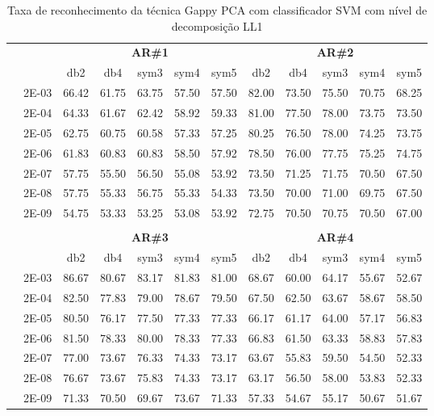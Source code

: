 \begin{table}[H]
	\centering
    \normalsize
	\caption{Taxa de reconhecimento da técnica Gappy PCA com classificador SVM com nível de decomposição LL1}
	\begin{tabular}{|c|c|c c c c c|c c c c c|}
\cline{3-12}
\multicolumn{2}{c|}{\multirow{2}{*}{}} & \multicolumn{5}{c|}{\textbf{AR\#1}}  & \multicolumn{5}{c|}{\textbf{AR\#2}} \\\cline{3-12}

\multicolumn{2}{c|}{}  & db2 & db4 & sym3 & sym4 & sym5 & db2 & db4& sym3 & sym4 & sym5 \\\hline
\multicolumn{1}{|c|}{ \multirow{6}{*}{\rotatebox[origin=c]{90}{\textbf{Gamma}}} }
&2E-03&	66.42&	61.75&	63.75&	57.50&	57.50&	82.00&	73.50&	75.50&	70.75&	68.25	\\\cline{2-12}
&2E-04&	64.33&	61.67&	62.42&	58.92&	59.33&	81.00&	77.50&	78.00&	73.75&	73.50	\\\cline{2-12}
&2E-05&	62.75&	60.75&	60.58&	57.33&	57.25&	80.25&	76.50&	78.00&	74.25&	73.75	\\\cline{2-12}
&2E-06&	61.83&	60.83&	60.83&	58.50&	57.92&	78.50&	76.00&	77.75&	75.25&	74.75	\\\cline{2-12}
&2E-07&	57.75&	55.50&	56.50&	55.08&	53.92&	73.50&	71.25&	71.75&	70.50&	67.50	\\\cline{2-12}
&2E-08&	57.75&	55.33&	56.75&	55.33&	54.33&	73.50&	70.00&	71.00&	69.75&	67.50	\\\cline{2-12}
&2E-09&	54.75&	53.33&	53.25&	53.08&	53.92&	72.75&	70.50&	70.75&	70.50&	67.00	


\\ \midrule
\multicolumn{12}{c}{}\\ 

\cline{3-12}
\multicolumn{2}{c}{} & \multicolumn{5}{|c|}{\textbf{AR\#3}}  & \multicolumn{5}{c|}{\textbf{AR\#4}} \\\cline{3-12}
\multicolumn{2}{c}{}  & \multicolumn{1}{|c}{db2} & db4 & sym3 & sym4 & sym5 & db2 & db4& sym3 & sym4 & sym5 \\\hline
\multicolumn{1}{|c|}{ \multirow{6}{*}{\rotatebox[origin=c]{90}{\textbf{Gamma}}} }
&2E-03&	86.67&	80.67&	83.17&	81.83&	81.00&	68.67&	60.00&	64.17&	55.67&	52.67	\\\cline{2-12}
&2E-04&	82.50&	77.83&	79.00&	78.67&	79.50&	67.50&	62.50&	63.67&	58.67&	58.50	\\\cline{2-12}
&2E-05&	80.50&	76.17&	77.50&	77.33&	77.33&	66.17&	61.17&	64.00&	57.17&	56.83	\\\cline{2-12}
&2E-06&	81.50&	78.33&	80.00&	78.33&	77.33&	66.83&	61.50&	63.33&	58.83&	57.83	\\\cline{2-12}
&2E-07&	77.00&	73.67&	76.33&	74.33&	73.17&	63.67&	55.83&	59.50&	54.50&	52.33	\\\cline{2-12}
&2E-08&	76.67&	73.67&	75.83&	74.33&	73.17&	63.17&	56.50&	58.00&	53.83&	52.33	\\\cline{2-12}
&2E-09&	71.33&	70.50&	69.67&	73.67&	71.33&	57.33&	54.67&	55.17&	50.67&	51.67	
	

\end{tabular}
\end{table}
